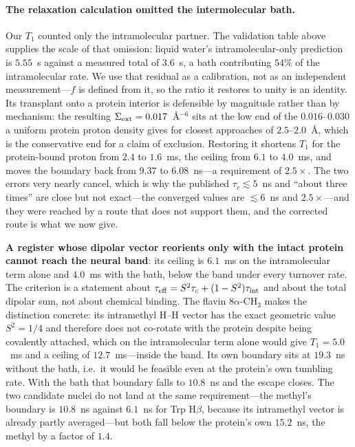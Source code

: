\documentclass[aps,prx,reprint,superscriptaddress,nofootinbib,floatfix]{revtex4-2}
\begin{document}
\paragraph*{The relaxation calculation omitted the intermolecular bath.} Our
$T_1$ counted only the intramolecular partner. The validation table above
supplies the scale of that omission: liquid water's
intramolecular-only prediction is $5.55$~s against a measured total of $3.6$~s, a
bath contributing $54\%$ of the intramolecular rate. We use that residual as a
calibration, not as an independent measurement---$f$ is defined from it, so the
ratio it restores to unity is an identity. Its transplant onto a protein interior
is defensible by magnitude rather than by mechanism: the resulting
$\Sigma_{\rm ext}=0.017$~\AA$^{-6}$ sits at the low end of the $0.016$--$0.030$ a
uniform protein proton density gives for closest approaches of $2.5$--$2.0$~\AA,
which is the conservative end for a claim of exclusion. Restoring it shortens
$T_1$ for the protein-bound proton from $2.4$ to $1.6$~ms, the ceiling from $6.1$
to $4.0$~ms, and moves the boundary back from $9.37$ to $6.08$~ns---a requirement
of $2.5\times$. The two errors very nearly cancel, which is why the published
$\tau_c\lesssim5$~ns and ``about three times'' are close but not exact---the
converged values are $\lesssim6$~ns and $2.5\times$---and they were reached by
a route that does not support them, and the corrected route is what we now give.

\textbf{A register whose dipolar vector reorients only with the intact protein
cannot reach the neural band}: its ceiling is $6.1$~ms on the intramolecular
term alone and $4.0$~ms with the bath, below the band under every turnover rate.
The criterion is a statement about $\tau_{\rm eff}=S^2\tau_c+(1-S^2)\tau_{\rm int}$
and about the total dipolar sum, not about chemical binding. The flavin
$8\alpha$-CH$_3$ makes the distinction concrete: its intramethyl H--H vector has
the exact geometric value $S^2=1/4$ and therefore does not co-rotate with the
protein despite being covalently attached, which on the intramolecular term alone
would give $T_1=5.0$~ms and a ceiling of $12.7$~ms---inside the band. Its own
boundary sits at $19.3$~ns without the bath, i.e.\ it would be feasible even at
the protein's own tumbling rate. With the bath that boundary falls to $10.8$~ns
and the escape closes. The two candidate nuclei do not land at the same requirement---the methyl's
boundary is $10.8$~ns against $6.1$~ns for Trp H$\beta$, because its intramethyl
vector is already partly averaged---but both fall below the protein's own
$15.2$~ns, the methyl by a factor of $1.4$.
\end{document}
